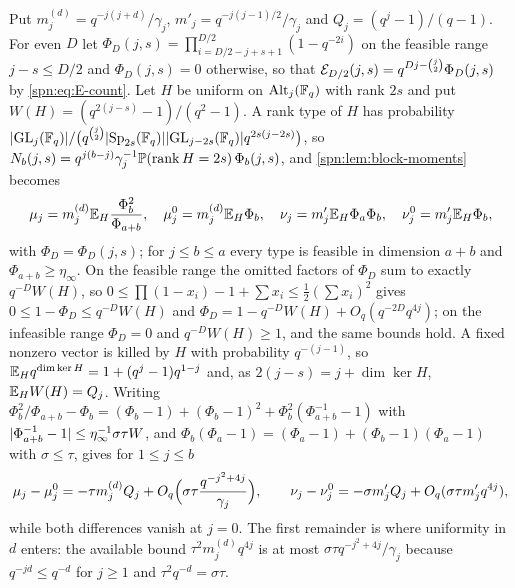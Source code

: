 Put $m_j^{(d)}=q^{-j(j+d)}/\gamma_j$, $m'_j=q^{-j(j-1)/2}/\gamma_j$ and $Q_j=(q^j-1)/(q-1)$. For even
$D$ let $\Phi_D(j,s)=\prod_{i=D/2-j+s+1}^{D/2}(1-q^{-2i})$ on the feasible range $j-s\le D/2$ and
$\Phi_D(j,s)=0$ otherwise, so that $\mathcal{E}_{D/2}(j,s)=q^{Dj-\binom j2}\Phi_D(j,s)$ by
\eqref{spn:eq:E-count}. Let $H$ be uniform on $\operatorname{Alt}_j(\mathbb{F}_q)$ with rank $2s$ and put
$W(H)=(q^{2(j-s)}-1)/(q^2-1)$. A rank type of $H$ has probability
$\lvert\operatorname{GL}_j(\mathbb{F}_q)\rvert/\bigl(q^{\binom j2}\lvert\operatorname{Sp}_{2s}(\mathbb{F}_q)\rvert\lvert\operatorname{GL}_{j-2s}(\mathbb{F}_q)\rvert q^{2s(j-2s)}\bigr)$,
so $N_b(j,s)=q^{j(b-j)}\gamma_j^{-1}\mathbb{P}(\operatorname{rank} H=2s)\,\Phi_b(j,s)$, and
\cref{spn:lem:block-moments} becomes
\begin{equation}\label{spn:eq:unified-moments}
 \mu_j=m_j^{(d)}\mathbb{E}_H\frac{\Phi_b^2}{\Phi_{a+b}},\quad \mu_j^0=m_j^{(d)}\mathbb{E}_H\Phi_b,\quad
 \nu_j=m'_j\mathbb{E}_H\Phi_a\Phi_b,\quad \nu_j^0=m'_j\mathbb{E}_H\Phi_b,
\end{equation}
with $\Phi_D=\Phi_D(j,s)$; for $j\le b\le a$ every type is feasible in dimension $a+b$ and
$\Phi_{a+b}\ge\eta_\infty$. On the feasible range the omitted factors of $\Phi_D$ sum to exactly
$q^{-D}W(H)$, so $0\le\prod(1-x_i)-1+\sum x_i\le\frac12(\sum x_i)^2$ gives
$0\le1-\Phi_D\le q^{-D}W(H)$ and $\Phi_D=1-q^{-D}W(H)+O_q(q^{-2D}q^{4j})$; on the infeasible range
$\Phi_D=0$ and $q^{-D}W(H)\ge1$, and the same bounds hold. A fixed nonzero vector is killed by $H$
with probability $q^{-(j-1)}$, so $\mathbb{E}_Hq^{\dim\ker H}=1+(q^j-1)q^{1-j}$ and, as
$2(j-s)=j+\dim\ker H$, $\mathbb{E}_HW(H)=Q_j$. Writing
$\Phi_b^2/\Phi_{a+b}-\Phi_b=(\Phi_b-1)+(\Phi_b-1)^2+\Phi_b^2(\Phi_{a+b}^{-1}-1)$ with
$\lvert\Phi_{a+b}^{-1}-1\rvert\le\eta_\infty^{-1}\sigma\tau W$, and
$\Phi_b(\Phi_a-1)=(\Phi_a-1)+(\Phi_b-1)(\Phi_a-1)$ with $\sigma\le\tau$, gives for $1\le j\le b$
\begin{equation}\label{spn:eq:first-moment-expansion}
 \mu_j-\mu_j^0=-\tau m_j^{(d)}Q_j+O_q\Bigl(\sigma\tau\frac{q^{-j^2+4j}}{\gamma_j}\Bigr),\qquad
 \nu_j-\nu_j^0=-\sigma m'_jQ_j+O_q(\sigma\tau m'_jq^{4j}),
\end{equation}
while both differences vanish at $j=0$. The first remainder is where uniformity in $d$ enters: the
available bound $\tau^2m_j^{(d)}q^{4j}$ is at most $\sigma\tau q^{-j^2+4j}/\gamma_j$ because
$q^{-jd}\le q^{-d}$ for $j\ge1$ and $\tau^2q^{-d}=\sigma\tau$.


